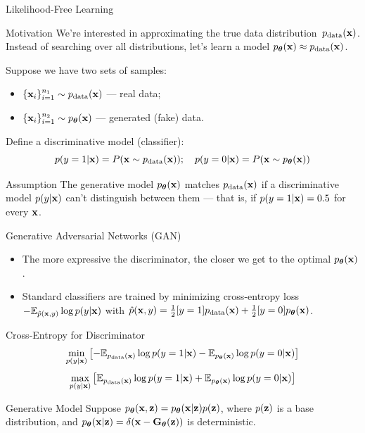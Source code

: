 \documentclass{beamer}
\renewcommand{\eqpause}{}
\begin{document}
\begin{frame}{Likelihood-Free Learning}
	\begin{block}{Motivation}
	 We're interested in approximating the true data distribution~$p_{\text{data}}(\mathbf{x})$.
	Instead of searching over all distributions, let's learn a model $p_{\boldsymbol{\theta}}(\mathbf{x}) \approx p_{\text{data}}(\mathbf{x})$.
	\end{block}
	\eqpause
	Suppose we have two sets of samples: 
	\begin{itemize}
		\item $\{\mathbf{x}_i\}_{i=1}^{n_1} \sim p_{\text{data}}(\mathbf{x})$ — real data;
		\item $\{\mathbf{x}_i\}_{i=1}^{n_2} \sim p_{\boldsymbol{\theta}}(\mathbf{x})$ — generated (fake) data.
	\end{itemize}
	\eqpause
	Define a discriminative model (classifier):
	\[
		p(y = 1 | \mathbf{x}) = P(\mathbf{x} \sim p_{\text{data}}(\mathbf{x})); \quad p(y = 0 | \mathbf{x}) = P(\mathbf{x} \sim p_{\boldsymbol{\theta}}(\mathbf{x}))
	\]
	\eqpause
	\vspace{-0.5cm}
	\begin{block}{Assumption}
		The generative model $p_{\boldsymbol{\theta}}(\mathbf{x})$ matches $p_{\text{data}}(\mathbf{x})$ if a discriminative model $p(y | \mathbf{x})$ can't distinguish between them --- that is, if $p(y = 1 | \mathbf{x}) = 0.5$ for every $\mathbf{x}$.
	\end{block}
\end{frame}
\begin{frame}{Generative Adversarial Networks (GAN)}
	\begin{itemize}
		\item The more expressive the discriminator, the closer we get to the optimal $p_{\boldsymbol{\theta}}(\mathbf{x})$.
		\item Standard classifiers are trained by minimizing cross-entropy loss $-\mathbb{E}_{\hat{p}(\mathbf{x}, y)} \log p(y | \mathbf{x})$ with $\hat{p}(\mathbf{x}, y) = \frac{1}{2} [y=1]p_{\text{data}}(\mathbf{x}) + \frac{1}{2} [y=0]p_{\boldsymbol{\theta}}(\mathbf{x})$.
	\end{itemize}
	\eqpause
	\begin{block}{Cross-Entropy for Discriminator}
		\vspace{-0.3cm}
		\[
			\min_{p(y | \mathbf{x})} \left[ - \mathbb{E}_{p_{\text{data}}(\mathbf{x})} \log p(y = 1 | \mathbf{x}) - \mathbb{E}_{p_{\boldsymbol{\theta}}(\mathbf{x})} \log p(y = 0 | \mathbf{x}) \right] 
		\]
		\[
			\max_{p(y | \mathbf{x})} \left[\mathbb{E}_{p_{\text{data}}(\mathbf{x})} \log p(y = 1 | \mathbf{x}) + \mathbb{E}_{p_{\boldsymbol{\theta}}(\mathbf{x})} \log p(y = 0 | \mathbf{x}) \right] 
		\]
	\end{block}
	\eqpause
	\vspace{-0.3cm}
	\begin{block}{Generative Model}
		Suppose $p_{\boldsymbol{\theta}}(\mathbf{x}, \mathbf{z}) = p_{\boldsymbol{\theta}}(\mathbf{x}| \mathbf{z}) p(\mathbf{z})$, where $p(\mathbf{z})$ is a base distribution, and $p_{\boldsymbol{\theta}}(\mathbf{x} | \mathbf{z}) = \delta (\mathbf{x} - \mathbf{G}_{\boldsymbol{\theta}}(\mathbf{z}))$ is deterministic.
	\end{block}
\end{frame}
\end{document}
